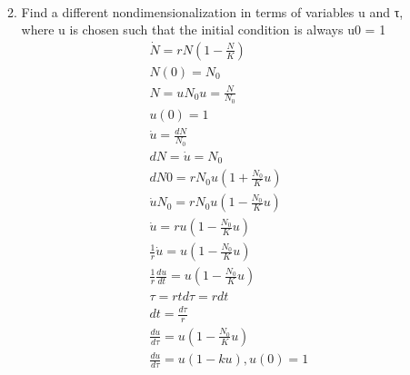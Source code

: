 \documentclass[a4paper,10pt]{article}
\begin{document}
\begin{enumerate}
\begin{enumerate}
\begin{equation}
\begin{aligned}
                    \end{aligned}
                \end{equation}
            \item  Find a different nondimensionalization in terms of variables u and τ, where u is chosen such that the initial condition is always u0 = 1
                \begin{equation}
                    \begin{aligned}
                        \dot{N}=rN(1-\frac{N}{K})\\
                        N(0)=N_{0}\\
                        N=uN_{0}
                        u=\frac{N}{N_{0}}\\
                        u(0)=1\\
                        \dot{u}=\frac{dN}{N_{0}}\\
                        \boxed{dN=\dot{u}=N_{0}}\\
                        dN0=rN_{0}u(1+\frac{N_{0}}{K}u)\\
                        \dot{u}N_{0}=rN_{0}u(1-\frac{N_{0}}{K}u)\\
                        \dot{u}=ru(1-\frac{N_{0}}{K}u)\\
                        \frac{1}{r}\dot{u}=u(1-\frac{N_{0}}{K}u)\\
                        \frac{1}{r}\frac{du}{dt}=u(1-\frac{N_{0}}{K}u)\\
                        \tau=rt
                        d\tau=rdt\\
                        dt=\frac{d\tau}{r}\\
                        \frac{du}{d\tau}=u(1-\frac{N_{0}}{K}u)\\
                        \boxed{\frac{du}{d\tau}=u(1-ku), u(0)=1}

                    \end{aligned}
                \end{equation}
            
        \end{enumerate}
       
    
      
\end{enumerate}
\end{document}
